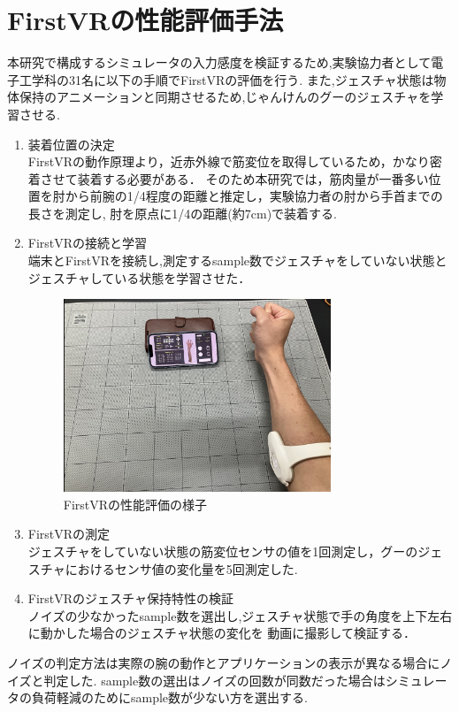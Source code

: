 \documentclass{ltjsreport}
\begin{document}
	\section{FirstVRの性能評価手法}
		本研究で構成するシミュレータの入力感度を検証するため,実験協力者として電子工学科の31名に以下の手順でFirstVRの評価を行う.
		また,ジェスチャ状態は物体保持のアニメーションと同期させるため,じゃんけんのグーのジェスチャを学習させる.
		\begin{enumerate}
			\item 装着位置の決定\\
				FirstVRの動作原理より，近赤外線で筋変位を取得しているため，かなり密着させて装着する必要がある．
				そのため本研究では，筋肉量が一番多い位置を肘から前腕の1/4程度の距離と推定し，実験協力者の肘から手首までの長さを測定し,
				肘を原点に1/4の距離(約7cm)で装着する.
			\item FirstVRの接続と学習\\
				端末とFirstVRを接続し,測定するsample数でジェスチャをしていない状態とジェスチャしている状態を学習させた．
				\begin{figure}[H]
				\centering
				\includegraphics[width = 8cm]{../figs/IMG_5202.PNG}
				\caption{FirstVRの性能評価の様子}
				\label{fig:firstVRtest}
				\end{figure}
			\item FirstVRの測定\\
				ジェスチャをしていない状態の筋変位センサの値を1回測定し，グーのジェスチャにおけるセンサ値の変化量を5回測定した.
			\item FirstVRのジェスチャ保持特性の検証\\
				ノイズの少なかったsample数を選出し,ジェスチャ状態で手の角度を上下左右に動かした場合のジェスチャ状態の変化を
				動画に撮影して検証する．
		\end{enumerate}

		ノイズの判定方法は実際の腕の動作とアプリケーションの表示が異なる場合にノイズと判定した.
		sample数の選出はノイズの回数が同数だった場合はシミュレータの負荷軽減のためにsample数が少ない方を選出する.
\end{document}
